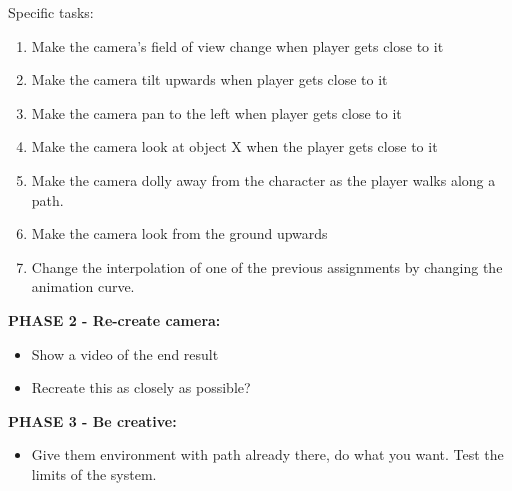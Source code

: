 Specific tasks:
\begin{enumerate}
\item Make the camera's field of view change when player gets close to it
\item Make the camera tilt upwards when player gets close to it
\item Make the camera pan to the left when player gets close to it
\item Make the camera look at object X when the player gets close to it
\item Make the camera dolly away from the character as the player walks along a path.
\item Make the camera look from the ground upwards
\item Change the interpolation of one of the previous assignments by changing the animation curve.
\end{enumerate}

\textbf{PHASE 2 - Re-create camera:}
\begin{itemize}
\item Show a video of the end result
\item Recreate this as closely as possible?
\end{itemize}

\textbf{PHASE 3 - Be creative:}
\begin{itemize}
\item Give them environment with path already there, do what you want. Test the limits of the system.
\end{itemize}
